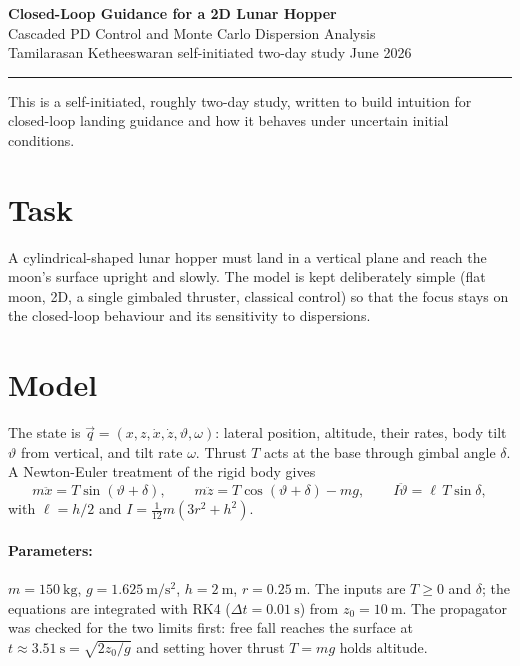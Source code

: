 \documentclass[11pt]{article}
\begin{document}
\begin{center}
  {\LARGE\bfseries Closed-Loop Guidance for a 2D Lunar Hopper}\\[3pt]
  {\large Cascaded PD Control and Monte Carlo Dispersion Analysis}\\[6pt]
  {\normalsize Tamilarasan Ketheeswaran \quad\textbar\quad self-initiated two-day study \quad\textbar\quad June 2026}
\end{center}
\vspace{1pt}\hrule\vspace{6pt}

This is a self-initiated, roughly two-day study, written to build intuition for closed-loop landing guidance and how it behaves under uncertain initial conditions. 

\section*{Task}
A cylindrical-shaped lunar hopper must land in a vertical plane and reach the moon's surface upright and slowly. The model is kept deliberately simple (flat moon, 2D, a single gimbaled thruster, classical control) so that the focus stays on the closed-loop behaviour and its sensitivity to dispersions.

\section*{Model}
The state is $\vec q=(x,z,\dot x,\dot z,\vartheta,\omega)$: lateral position, altitude, their rates, body tilt $\vartheta$ from vertical, and tilt rate $\omega$. Thrust $T$ acts at the base through gimbal angle $\delta$. A Newton-Euler treatment of the rigid body gives
\begin{equation}
  m\ddot x = T\sin(\vartheta+\delta),\qquad
  m\ddot z = T\cos(\vartheta+\delta)-mg,\qquad
  I\ddot\vartheta = \ell\,T\sin\delta ,
\end{equation}
with $\ell=h/2$ and $I=\tfrac{1}{12}m(3r^2+h^2)$. 
\paragraph{Parameters:}$m=150~\mathrm{kg}$, $g=1.625~\mathrm{m/s^2}$, $h=2~\mathrm{m}$, $r=0.25~\mathrm{m}$. The inputs are $T\ge 0$ and $\delta$; the equations are integrated with RK4 ($\Delta t=0.01~\mathrm{s}$) from $z_0=10~\mathrm{m}$. The propagator was checked for the two limits first: free fall reaches the surface at $t\approx3.51~\mathrm{s}=\sqrt{2z_0/g}$ and setting hover thrust $T=mg$ holds altitude.
\end{document}
